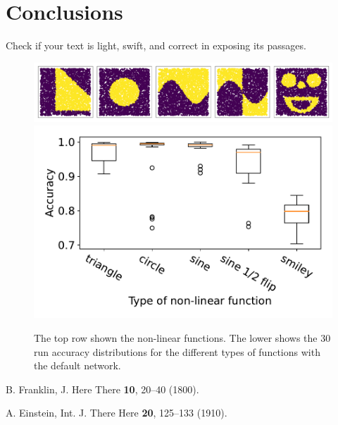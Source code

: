 \documentclass[prl,twocolumn]{revtex4-1}
\begin{document}




\section{Conclusions}


Check if your text is light, swift, and correct in exposing its passages.








\begin{figure}[!tb]
  \includegraphics[width = \figwidth]{task_1/figures/non_linear_functions_2.pdf}
  \vskip 0.5mm
  \includegraphics[width=\figwidth]{task_1/figures/types_box_30_2.pdf}
  \caption{The top row shown the non-linear functions. The lower shows the 30 run accuracy distributions for the different types of functions with the default network.}
  \label{fig:non-linear_functions}
\end{figure}



\begin{thebibliography}{99}

  B. Franklin,
  J. Here There {\bf 10}, 20--40 (1800).
  
  A. Einstein,
  Int. J. There Here {\bf 20}, 125--133 (1910).
  
\end{thebibliography}

\clearpage

\end{document}
